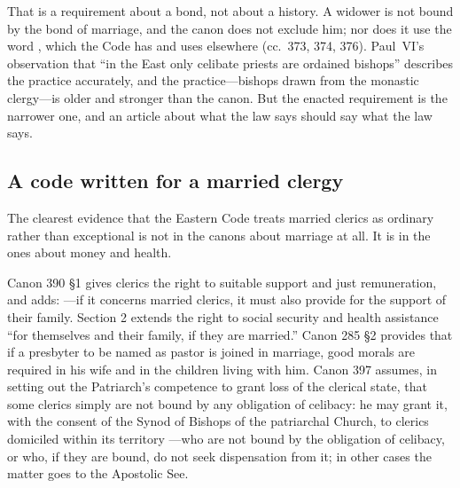 That is a requirement about a bond, not about a history. A widower is not bound by the bond of marriage, and the canon does not exclude him; nor does it use the word , which the Code has and uses elsewhere (cc.~373, 374, 376). Paul~VI's observation that ``in the East only celibate priests are ordained bishops'' describes the practice accurately, and the practice---bishops drawn from the monastic clergy---is older and stronger than the canon. But the enacted requirement is the narrower one, and an article about what the law says should say what the law says.

\subsection{A code written for a married clergy}

The clearest evidence that the Eastern Code treats married clerics as ordinary rather than exceptional is not in the canons about marriage at all. It is in the ones about money and health.

Canon 390 §1 gives clerics the right to suitable support and just remuneration, and adds: ---if it concerns married clerics, it must also provide for the support of their family. Section 2 extends the right to social security and health assistance ``for themselves and their family, if they are married.'' Canon 285 §2 provides that if a presbyter to be named as pastor is joined in marriage, good morals are required in his wife and in the children living with him. Canon 397 assumes, in setting out the Patriarch's competence to grant loss of the clerical state, that some clerics simply are not bound by any obligation of celibacy: he may grant it, with the consent of the Synod of Bishops of the patriarchal Church, to clerics domiciled within its territory ---who are not bound by the obligation of celibacy, or who, if they are bound, do not seek dispensation from it; in other cases the matter goes to the Apostolic See.

